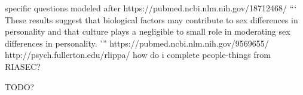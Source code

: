 \documentclass[review]{elsarticle}
\begin{document}
specific questions modeled after https://pubmed.ncbi.nlm.nih.gov/18712468/
```
These results suggest that biological factors may contribute to sex differences in personality and that culture plays a negligible to small role in moderating sex differences in personality.
'''
https://pubmed.ncbi.nlm.nih.gov/9569655/
http://psych.fullerton.edu/rlippa/
how do i complete people-things from RIASEC?

%
%

TODO?
\end{document}
